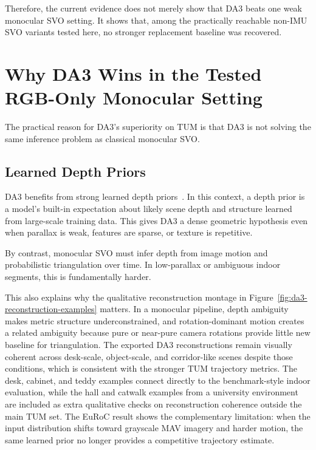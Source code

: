 \documentclass[conference]{IEEEtran}
\begin{document}
Therefore, the current evidence does not merely show that DA3 beats one weak monocular SVO setting. It shows that, among the practically reachable non-IMU SVO variants tested here, no stronger replacement baseline was recovered.

\section{Why DA3 Wins in the Tested RGB-Only Monocular Setting}
The practical reason for DA3's superiority on TUM is that DA3 is not solving the same inference problem as classical monocular SVO.

\subsection{Learned Depth Priors}
DA3 benefits from strong learned depth priors~\cite{lin2025depthanything3}. In this context, a depth prior is a model's built-in expectation about likely scene depth and structure learned from large-scale training data. This gives DA3 a dense geometric hypothesis even when parallax is weak, features are sparse, or texture is repetitive.

By contrast, monocular SVO must infer depth from image motion and probabilistic triangulation over time. In low-parallax or ambiguous indoor segments, this is fundamentally harder.

This also explains why the qualitative reconstruction montage in Figure~\ref{fig:da3-reconstruction-examples} matters. In a monocular pipeline, depth ambiguity makes metric structure underconstrained, and rotation-dominant motion creates a related ambiguity because pure or near-pure camera rotations provide little new baseline for triangulation. The exported DA3 reconstructions remain visually coherent across desk-scale, object-scale, and corridor-like scenes despite those conditions, which is consistent with the stronger TUM trajectory metrics. The desk, cabinet, and teddy examples connect directly to the benchmark-style indoor evaluation, while the hall and catwalk examples from a university environment are included as extra qualitative checks on reconstruction coherence outside the main TUM set. The EuRoC result shows the complementary limitation: when the input distribution shifts toward grayscale MAV imagery and harder motion, the same learned prior no longer provides a competitive trajectory estimate.
\end{document}
